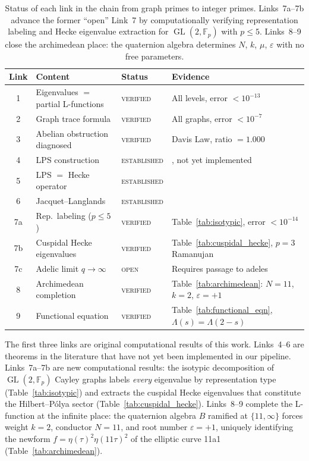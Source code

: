 \documentclass[12pt,reqno]{amsart}
\theoremstyle{plain}
\theoremstyle{definition}
\theoremstyle{remark}
\DeclareMathOperator{\GL}{GL}
\newcommand{\FF}{\mathbb{F}}
\begin{document}
\begin{table}[ht]
\centering
\renewcommand{\arraystretch}{1.2}
\begin{tabular}{clll}
  \toprule
  Link & Content & Status & Evidence \\
  \midrule
  1 & Eigenvalues $=$ partial L-functions & \textsc{verified}
    & All levels, error $< 10^{-13}$ \\
  2 & Graph trace formula & \textsc{verified}
    & All graphs, error $< 10^{-7}$ \\
  3 & Abelian obstruction diagnosed & \textsc{verified}
    & Davis Law, ratio $= 1.000$ \\
  4 & LPS construction & \textsc{established}
    & \cite{lps1988}, not yet implemented \\
  5 & LPS $=$ Hecke operator & \textsc{established}
    & \cite{lps1988, lubotzky1994} \\
  6 & Jacquet--Langlands & \textsc{established}
    & \cite{jacquet_langlands1970} \\
  7a & Rep.\ labeling ($p \leq 5$) & \textsc{verified}
    & Table~\ref{tab:isotypic}, error $< 10^{-14}$ \\
  7b & Cuspidal Hecke eigenvalues & \textsc{verified}
    & Table~\ref{tab:cuspidal_hecke}, $p=3$ Ramanujan \\
  7c & Adelic limit $q \to \infty$ & \textsc{open}
    & Requires passage to adeles \\
  8 & Archimedean completion & \textsc{verified}
    & Table~\ref{tab:archimedean}: $N{=}11$, $k{=}2$, $\varepsilon{=}{+}1$ \\
  9 & Functional equation & \textsc{verified}
    & Table~\ref{tab:functional_eqn}, $\Lambda(s) = \Lambda(2{-}s)$ \\
  \bottomrule
\end{tabular}
\caption{Status of each link in the chain from graph primes to
  integer primes.  Links~7a--7b advance the former ``open'' Link~7
  by computationally verifying representation labeling and Hecke
  eigenvalue extraction for $\GL(2, \FF_p)$ with $p \leq 5$.
  Links~8--9 close the archimedean place: the quaternion algebra
  determines $N$, $k$, $\mu$, $\varepsilon$ with no free parameters.}
\label{tab:links}
\end{table}

The first three links are original computational results of this work.
Links~4--6 are theorems in the literature that have not yet been
implemented in our pipeline.  Links~7a--7b are new computational
results: the isotypic decomposition of $\GL(2, \FF_p)$ Cayley graphs
labels \emph{every} eigenvalue by representation type
(Table~\ref{tab:isotypic}) and extracts the cuspidal Hecke eigenvalues
that constitute the Hilbert--P\'olya sector
(Table~\ref{tab:cuspidal_hecke}).  Links~8--9 complete the L-function
at the infinite place: the quaternion algebra $B$ ramified at
$\{11, \infty\}$ forces weight $k = 2$, conductor $N = 11$, and
root number $\varepsilon = +1$, uniquely identifying the newform
$f = \eta(\tau)^2\eta(11\tau)^2$ of the elliptic curve 11a1
(Table~\ref{tab:archimedean}).
\end{document}
